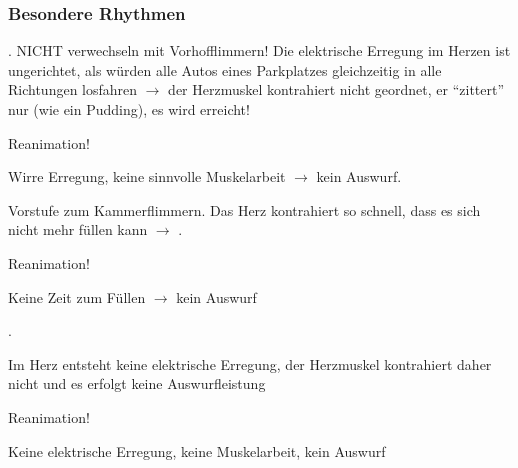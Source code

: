 \subsubsection{Besondere Rhythmen}





{. 
\label{topic:kammerflimmern}
%
NICHT verwechseln mit Vorhofflimmern! Die elektrische
Erregung im Herzen ist ungerichtet, als würden alle Autos
eines Parkplatzes gleichzeitig in alle Richtungen losfahren
${\rightarrow}$ der Herzmuskel kontrahiert nicht geordnet,
er \enquote{zittert} nur (wie ein Pudding), es wird  erreicht!
}
{
\begin{compactitem}
  \item {Reanimation!}
  \item Wirre Erregung, keine sinnvolle Muskelarbeit ${\rightarrow}$ kein
  Auswurf.
\end{compactitem}

}{}{}{}

    
{ 
\label{topic:pulslose-ventrikulaere-tachykardie}
%
Vorstufe zum Kammerflimmern. Das Herz kontrahiert
so schnell, dass es sich nicht mehr füllen kann
${\rightarrow}$ .
}
{
\begin{compactitem}
  \item  {Reanimation!}
  \item Keine Zeit zum Füllen ${\rightarrow}$ kein Auswurf
\end{compactitem}

}





{. 
\label{topic:asystolie}

Im Herz entsteht keine elektrische
Erregung, der Herzmuskel kontrahiert daher nicht und es erfolgt
{keine Auswurfleistung} 
}{
\begin{compactitem}
  \item {Reanimation!}
  \item Keine elektrische Erregung, keine Muskelarbeit, kein Auswurf
\end{compactitem}
}{}{}{}
    
